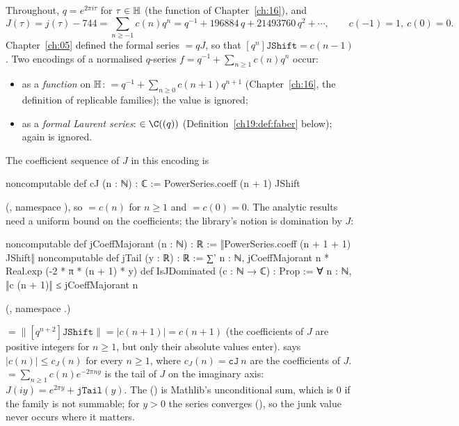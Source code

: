 Throughout, $q=e^{2\pi i\tau}$ for $\tau\in\mathbb{H}$ (the function  of Chapter~\ref{ch:16}), and
\begin{equation*}
  J(\tau)=j(\tau)-744=\sum_{n\ge-1}c(n)q^n=q^{-1}+196884\,q+21493760\,q^2+\cdots,\qquad c(-1)=1,\ c(0)=0 .
\end{equation*}
Chapter~\ref{ch:05} defined the formal series  $=qJ$, so that $[q^n]\mathtt{JShift}=c(n-1)$.  Two
encodings of a normalised $q$-series $f=q^{-1}+\sum_{n\ge1}c(n)q^n$ occur:
\begin{itemize}
\item as a \emph{function} on $\mathbb{H}$:  $=q^{-1}+\sum_{n\ge0}c(n+1)q^{n+1}$
  (Chapter~\ref{ch:16}, the definition of replicable families); the value  is ignored;
\item as a \emph{formal Laurent series}:  $\in\C((q))$ (Definition~\ref{ch19:def:faber} below);
  again  is ignored.
\end{itemize}
The coefficient sequence of $J$ in this encoding is
\begin{leancode}
noncomputable def cJ (n : ℕ) : ℂ := PowerSeries.coeff (n + 1) JShift
\end{leancode}
(, namespace ), so
 $=c(n)$ for $n\ge1$ and  $=c(0)=0$.  The analytic results need a uniform bound on the
coefficients; the library's notion is domination by $J$:
\begin{leancode}
noncomputable def jCoeffMajorant (n : ℕ) : ℝ := ‖PowerSeries.coeff (n + 1 + 1) JShift‖
noncomputable def jTail (y : ℝ) : ℝ :=
  ∑' n : ℕ, jCoeffMajorant n * Real.exp (-2 * π * (n + 1) * y)
def IsJDominated (c : ℕ → ℂ) : Prop :=
  ∀ n : ℕ, ‖c (n + 1)‖ ≤ jCoeffMajorant n
\end{leancode}
(, namespace .)
\begin{dictionary}
 $=\|[q^{n+2}]\mathtt{JShift}\|=|c(n+1)|=c(n+1)$ (the coefficients of $J$ are positive integers
for $n\ge1$, but only their absolute values enter).   says $|c(n)|\le c_J(n)$ for every $n\ge1$,
where $c_J(n)=\mathtt{cJ}\ n$ are the coefficients of $J$.  
$=\sum_{n\ge1}c(n)e^{-2\pi ny}$ is the tail of $J$ on the imaginary axis: $J(iy)=e^{2\pi y}+\mathtt{jTail}(y)$.  The
 () is Mathlib's unconditional sum, which is $0$ if the family is not summable; for $y>0$ the
series converges (), so the junk value never occurs where it matters.
\end{dictionary}
